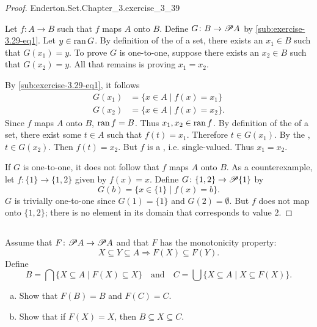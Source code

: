 \documentclass{report}
\begin{document}
\begin{proof}

    {Enderton.Set.Chapter\_3.exercise\_3\_39}

  Let $f \colon A \rightarrow B$ such that $f$ maps $A$ onto $B$.
  Define $G \colon B \rightarrow \mathscr{P}A$ by
    \eqref{sub:exercise-3.29-eq1}.
  Let $y \in \mathop{\text{ran}}{G}$.
  By definition of the  of a set, there exists an
    $x_1 \in B$ such that $G(x_1) = y$.
  To prove $G$ is one-to-one, suppose there exists an $x_2 \in B$ such
    that $G(x_2) = y$.
  All that remains is proving $x_1 = x_2$.

  By \eqref{sub:exercise-3.29-eq1}, it follows
    \begin{align*}
      G(x_1) & = \{x \in A \mid f(x) = x_1\} \\
      G(x_2) & = \{x \in A \mid f(x) = x_2\}.
    \end{align*}
  Since $f$ maps $A$ onto $B$, $\mathop{\text{ran}}{f} = B$.
  Thus $x_1, x_2 \in \mathop{\text{ran}}{f}$.
  By definition of the  of a set, there exist some $t \in A$
    such that $f(t) = x_1$.
  Therefore $t \in G(x_1)$.
  By the , $t \in G(x_2)$.
  Then $f(t) = x_2$.
  But $f$ is a , i.e. single-valued.
  Thus $x_1 = x_2$.

  \suitdivider
  If $G$ is one-to-one, it does not follow that $f$ maps $A$ onto $B$.
  As a counterexample, let $f \colon \{1\} \rightarrow \{1, 2\}$ given by
    $f(x) = x$.
  Define $G \colon \{1, 2\} \rightarrow \mathscr{P}\{1\}$ by
    $$G(b) = \{x \in \{1\} \mid f(x) = b\}.$$
  $G$ is trivially one-to-one since $G(1) = \{1\}$ and $G(2) = \emptyset$.
  But $f$ does not map onto $\{1, 2\}$; there is no element in its domain that
    corresponds to value $2$.

\end{proof}

\subsection{}%

Assume that $F \colon \mathscr{P}A \rightarrow \mathscr{P}A$ and that $F$ has
  the monotonicity property:
  $$X \subseteq Y \subseteq A \Rightarrow F(X) \subseteq F(Y).$$
Define
  $$B = \bigcap\{X \subseteq A \mid F(X) \subseteq X\} \quad\text{and}\quad
    C = \bigcup\{X \subseteq A \mid X \subseteq F(X)\}.$$
\begin{enumerate}[(a)]
  \item Show that $F(B) = B$ and $F(C) = C$.
  \item Show that if $F(X) = X$, then $B \subseteq X \subseteq C$.
\end{enumerate}
\end{document}
